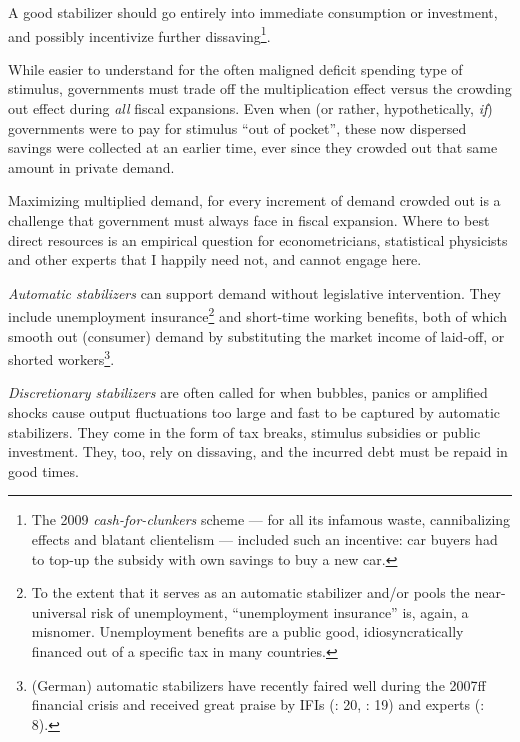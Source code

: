 A good stabilizer should go entirely into immediate consumption or investment, and possibly incentivize further dissaving\footnote{
	The 2009 \emph{cash-for-clunkers} scheme --- for all its infamous waste, cannibalizing effects and blatant clientelism --- included such an incentive: car buyers had to top-up the subsidy with own savings to buy a new car.}.

While easier to understand for the often maligned deficit spending type of stimulus, governments must trade off the multiplication effect versus the crowding out effect during \emph{all} fiscal expansions. Even when (or rather, hypothetically, \emph{if}) governments were to pay for stimulus ``out of pocket'', these now dispersed savings were collected at an earlier time, ever since they crowded out that same amount in private demand.

Maximizing multiplied demand, for every increment of demand crowded out is a challenge that government must always face in fiscal expansion. Where to best direct resources is an empirical question for econometricians, statistical physicists and other experts that I happily need not, and cannot engage here. 
	
\emph{Automatic stabilizers} can support demand without legislative intervention. They include unemployment insurance\footnote{
	To the extent that it serves as an automatic stabilizer and/or pools the near-universal risk of unemployment, ``unemployment insurance'' is, again, a misnomer. Unemployment benefits are a public good, idiosyncratically financed out of a specific tax in many countries.} %
and short-time working benefits, both of which smooth out (consumer) demand by substituting the market income of laid-off, or shorted workers\footnote{
	(German) automatic stabilizers have recently faired well during the 2007ff financial crisis and received great praise by \glspl{IFI} (\citealt{IMF-2008-ab}: 20, \citealt{WorldBank2008}: 19) and experts (\citealt{BofingerFranz-2007-aa}: 8).}. 

\emph{Discretionary stabilizers} are often called for when bubbles, panics or amplified shocks cause output fluctuations too large and fast to be captured by automatic stabilizers. They come in the form of tax breaks, stimulus subsidies or public investment. They, too, rely on dissaving, and the incurred debt must be repaid in good times. 

